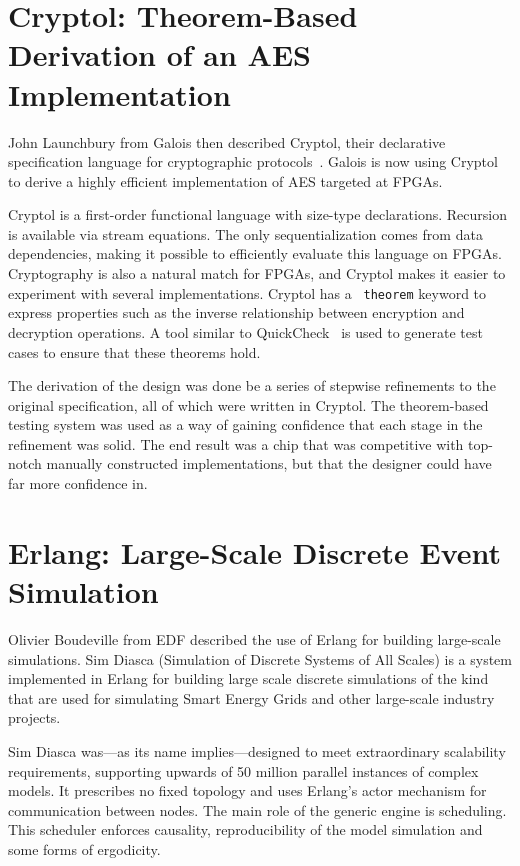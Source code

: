 \documentclass{jfp1}
\begin{document}
\section{Cryptol: Theorem-Based Derivation of an AES Implementation}

John Launchbury from Galois then described Cryptol, their declarative
specification language for cryptographic
protocols~\cite{Erkok:2009:PES:1481848.1481860}.  Galois is now using Cryptol
to derive a highly efficient implementation of AES targeted at FPGAs.

Cryptol is a first-order functional language with size-type declarations.
Recursion is available via stream equations.  The only sequentialization comes
from data dependencies, making it possible to efficiently evaluate this
language on FPGAs. Cryptography is also a natural match for FPGAs, and Cryptol
makes it easier to experiment with several implementations. Cryptol has a {\tt
theorem} keyword to express properties such as the inverse relationship between
encryption and decryption operations. A tool similar to
QuickCheck~\cite{Claessen:2000:QLT:351240.351266} is used to generate test
cases to ensure that these theorems hold.

The derivation of the design was done be a series of stepwise refinements to
the original specification, all of which were written in Cryptol.  The
theorem-based testing system was used as a way of gaining confidence that each
stage in the refinement was solid.  The end result was a chip that was
competitive with top-notch manually constructed implementations, but that the
designer could have far more confidence in.

\section{Erlang: Large-Scale Discrete Event Simulation}

Olivier Boudeville from EDF described the use of Erlang for building
large-scale simulations.  Sim Diasca (Simulation of Discrete Systems of All
Scales) is a system implemented in Erlang for building large scale discrete
simulations of the kind that are used for simulating Smart Energy Grids and
other large-scale industry projects.

Sim Diasca was---as its name implies---designed to meet extraordinary
scalability requirements, supporting upwards of 50 million parallel instances
of complex models.  It prescribes no fixed topology and uses Erlang's actor
mechanism for communication between nodes.  The main role of the generic engine
is scheduling.  This scheduler enforces causality, reproducibility of the model
simulation and some forms of ergodicity.
\end{document}
